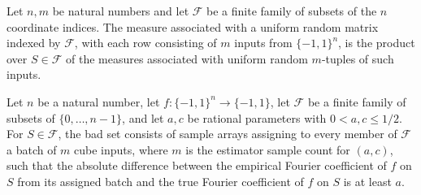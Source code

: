 \begin{theorem}
\label{FABL.uniformSampleMatrix_toMeasure_eq_pi}
\leanok
{}
Let $n,m$ be natural numbers and let $\mathcal F$ be a finite family of subsets of the
$n$ coordinate indices. The measure associated with a uniform random matrix indexed by
$\mathcal F$, with each row consisting of $m$ inputs from $\{−1,1\}^n$, is the product
over $S\in\mathcal F$ of the measures associated with uniform random $m$-tuples of such
inputs.
\end{theorem}

\begin{definition}
\label{FABL.finiteFamilyCoefficientBadSetWithParameters}
\leanok
{}
Let $n$ be a natural number, let $f:\{−1,1\}^n\to\{−1,1\}$, let $\mathcal F$ be a finite
family of subsets of $\{0,\ldots,n-1\}$, and let $a,c$ be rational parameters with
$0<a,c\le 1/2$. For $S\in\mathcal F$, the bad set consists of sample arrays assigning to
every member of $\mathcal F$ a batch of $m$ cube inputs, where $m$ is the estimator
sample count for $(a,c)$, such that the absolute difference between the empirical
Fourier coefficient of $f$ on $S$ from its assigned batch and the true Fourier
coefficient of $f$ on $S$ is at least $a$.
\end{definition}

